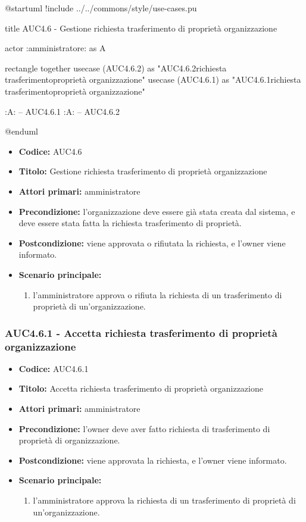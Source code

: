 \documentclass[casi-duso]{subfiles}
\begin{document}
\begin{plantuml}
@startuml
!include ../../commons/style/use-cases.pu

title AUC4.6 - Gestione richiesta trasferimento di proprietà organizzazione

actor :amministratore: as A

rectangle {
  together {
    usecase (AUC4.6.2) as "AUC4.6.2\nRifiuta richiesta trasferimento\ndi proprietà organizzazione"
    usecase (AUC4.6.1) as "AUC4.6.1\nAccetta richiesta trasferimento\ndi proprietà organizzazione"
  }
}

:A: -- AUC4.6.1
:A: -- AUC4.6.2

@enduml
\end{plantuml}

\begin{itemize}
  \item \textbf{Codice:} AUC4.6
  \item \textbf{Titolo:} Gestione richiesta trasferimento di proprietà organizzazione
  \item \textbf{Attori primari:} amministratore
  \item \textbf{Precondizione:} l'organizzazione deve essere già stata creata dal sistema, e deve essere stata fatta la richiesta trasferimento di proprietà.
  \item \textbf{Postcondizione:} viene approvata o rifiutata la richiesta, e l'owner viene informato.
  \item \textbf{Scenario principale:}
  \begin{enumerate}
    \item l'amministratore approva o rifiuta la richiesta di un trasferimento di proprietà di un'organizzazione.
  \end{enumerate}
\end{itemize}


\subsubsection{AUC4.6.1 - Accetta richiesta trasferimento di proprietà organizzazione}%
\label{subsub:AUC4.6.1}
\begin{itemize}
  \item \textbf{Codice:} AUC4.6.1
  \item \textbf{Titolo:} Accetta richiesta trasferimento di proprietà organizzazione
  \item \textbf{Attori primari:} amministratore
  \item \textbf{Precondizione:} l'owner deve aver fatto richiesta di trasferimento di proprietà di organizzazione.
  \item \textbf{Postcondizione:} viene approvata la richiesta, e l'owner viene informato.
  \item \textbf{Scenario principale:}
  \begin{enumerate}
    \item l'amministratore approva la richiesta di un trasferimento di proprietà di un'organizzazione.
  \end{enumerate}
\end{itemize}  
\end{document}
